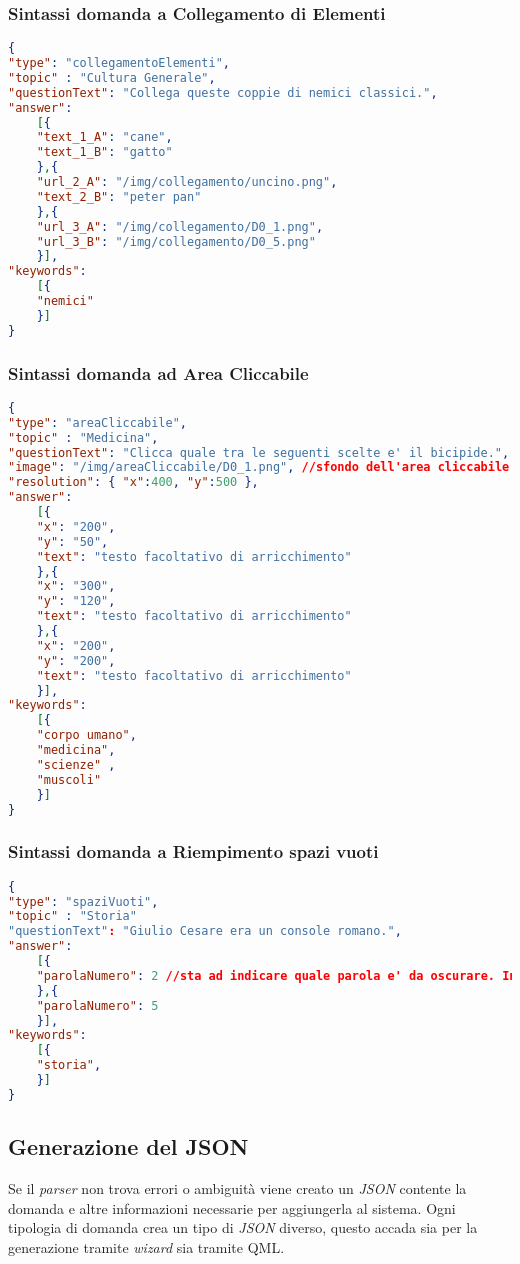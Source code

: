\subsubsection{Sintassi domanda a Collegamento di Elementi}
\begin{lstlisting}[language=json,firstnumber=1]
{
"type": "collegamentoElementi",
"topic" : "Cultura Generale",
"questionText": "Collega queste coppie di nemici classici.",
"answer":
	[{
	"text_1_A": "cane",
	"text_1_B": "gatto"
	},{
	"url_2_A": "/img/collegamento/uncino.png",
	"text_2_B": "peter pan"
	},{
	"url_3_A": "/img/collegamento/D0_1.png",
	"url_3_B": "/img/collegamento/D0_5.png"
	}],
"keywords":
	[{
	"nemici"
	}]
}
\end{lstlisting}

\subsubsection{Sintassi domanda ad Area Cliccabile}
\begin{lstlisting}[language=json,firstnumber=1]
{
"type": "areaCliccabile",
"topic" : "Medicina",
"questionText": "Clicca quale tra le seguenti scelte e' il bicipide.",
"image": "/img/areaCliccabile/D0_1.png", //sfondo dell'area cliccabile
"resolution": { "x":400, "y":500 },
"answer":
	[{
	"x": "200",
	"y": "50",
	"text": "testo facoltativo di arricchimento"
	},{
	"x": "300",
	"y": "120",
	"text": "testo facoltativo di arricchimento"
	},{
	"x": "200",
	"y": "200",
	"text": "testo facoltativo di arricchimento"
	}],
"keywords":
	[{
	"corpo umano",
	"medicina",
	"scienze" ,
	"muscoli"
	}]
}
\end{lstlisting}

\subsubsection{Sintassi domanda a Riempimento spazi vuoti}
\begin{lstlisting}[language=json,firstnumber=1]
{
"type": "spaziVuoti",
"topic" : "Storia"
"questionText": "Giulio Cesare era un console romano.",
"answer":
	[{
	"parolaNumero": 2 //sta ad indicare quale parola e' da oscurare. In questo caso la numero 2
	},{
	"parolaNumero": 5
	}],
"keywords":
	[{
	"storia",
	}] 
}
\end{lstlisting}

\subsection{Generazione del JSON}
Se il \textit{parser} non trova errori o ambiguità viene creato un \textit{JSON} contente la domanda e altre informazioni necessarie per aggiungerla al sistema. Ogni tipologia di domanda crea un tipo di \textit{JSON} diverso, questo accada sia per la generazione tramite \textit{wizard} sia tramite QML.

